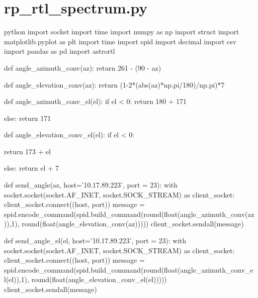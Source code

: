 \section*{rp\_rtl\_spectrum.py}

\begin{sourcecode}[]{python}{}
import socket
import time
import numpy as np
import struct
import matplotlib.pyplot as plt
import time
import spid
import decimal
import csv
import pandas as pd
import astrortl

def angle_azimuth_conv(az):
    return 261 - (90 - az)

def angle_elevation_conv(az):
    return (1-2*(abs(az)*np.pi/180)/np.pi)*7

def angle_azimuth_conv_el(el):
    if el < 0:
        return 180 + 171

    else:
        return 171

def angle_elevation_conv_el(el):
    if el < 0:
        
        return 173 + el

    else:
        return el + 7
        

def send_angle(az, host='10.17.89.223', port = 23):
    with socket.socket(socket.AF_INET, socket.SOCK_STREAM) as client_socket:
        client_socket.connect((host, port))
        message = spid.encode_command(spid.build_command(round(float(angle_azimuth_conv(az)),1), round(float(angle_elevation_conv(az)))))
        client_socket.sendall(message)

def send_angle_el(el, host='10.17.89.223', port = 23):
    with socket.socket(socket.AF_INET, socket.SOCK_STREAM) as client_socket:
        client_socket.connect((host, port))
        message = spid.encode_command(spid.build_command(round(float(angle_azimuth_conv_el(el)),1), round(float(angle_elevation_conv_el(el)))))
        client_socket.sendall(message)

\end{sourcecode}

\label{fig:soporte_patas}
\label{fig:soporte_feed}
\label{fig:paleta}
\label{fig:paleta_feed}
 \label{fig:soporte_patch}